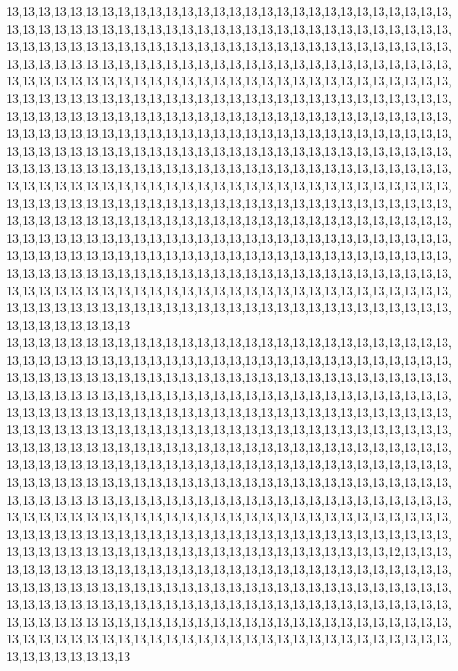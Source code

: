 13,13,13,13,13,13,13,13,13,13,13,13,13,13,13,13,13,13,13,13,13,13,13,13,13,13,13,13,13,13,13,13,13,13,13,13,13,13,13,13,13,13,13,13,13,13,13,13,13,13,13,13,13,13,13,13,13,13,13,13,13,13,13,13,13,13,13,13,13,13,13,13,13,13,13,13,13,13,13,13,13,13,13,13,13,13,13,13,13,13,13,13,13,13,13,13,13,13,13,13,13,13,13,13,13,13,13,13,13,13,13,13,13,13,13,13,13,13,13,13,13,13,13,13,13,13,13,13,13,13,13,13,13,13,13,13,13,13,13,13,13,13,13,13,13,13,13,13,13,13,13,13,13,13,13,13,13,13,13,13,13,13,13,13,13,13,13,13,13,13,13,13,13,13,13,13,13,13,13,13,13,13,13,13,13,13,13,13,13,13,13,13,13,13,13,13,13,13,13,13,13,13,13,13,13,13,13,13,13,13,13,13,13,13,13,13,13,13,13,13,13,13,13,13,13,13,13,13,13,13,13,13,13,13,13,13,13,13,13,13,13,13,13,13,13,13,13,13,13,13,13,13,13,13,13,13,13,13,13,13,13,13,13,13,13,13,13,13,13,13,13,13,13,13,13,13,13,13,13,13,13,13,13,13,13,13,13,13,13,13,13,13,13,13,13,13,13,13,13,13,13,13,13,13,13,13,13,13,13,13,13,13,13,13,13,13,13,13,13,13,13,13,13,13,13,13,13,13,13,13,13,13,13,13,13,13,13,13,13,13,13,13,13,13,13,13,13,13,13,13,13,13,13,13,13,13,13,13,13,13,13,13,13,13,13,13,13,13,13,13,13,13,13,13,13,13,13,13,13,13,13,13,13,13,13,13,13,13,13,13,13,13,13,13,13,13,13,13,13,13,13,13,13,13,13,13,13,13,13,13,13,13,13,13,13,13,13,13,13,13,13,13,13,13,13,13,13,13,13,13,13,13,13,13,13,13,13,13,13,13,13,13,13,13,13,13,13,13,13,13,13,13,13,13,13,13,13,13,13,13,13,13,13,13,13,13,13,13,13,13,13,13,13,13,13,13,13,13,13,13,13,13,13,13,13,13,13,13,13,13,13,13,13,13,13,13,13,13,13,13,13,13,13,13,13,13,13,13,13,13,13,13
13,13,13,13,13,13,13,13,13,13,13,13,13,13,13,13,13,13,13,13,13,13,13,13,13,13,13,13,13,13,13,13,13,13,13,13,13,13,13,13,13,13,13,13,13,13,13,13,13,13,13,13,13,13,13,13,13,13,13,13,13,13,13,13,13,13,13,13,13,13,13,13,13,13,13,13,13,13,13,13,13,13,13,13,13,13,13,13,13,13,13,13,13,13,13,13,13,13,13,13,13,13,13,13,13,13,13,13,13,13,13,13,13,13,13,13,13,13,13,13,13,13,13,13,13,13,13,13,13,13,13,13,13,13,13,13,13,13,13,13,13,13,13,13,13,13,13,13,13,13,13,13,13,13,13,13,13,13,13,13,13,13,13,13,13,13,13,13,13,13,13,13,13,13,13,13,13,13,13,13,13,13,13,13,13,13,13,13,13,13,13,13,13,13,13,13,13,13,13,13,13,13,13,13,13,13,13,13,13,13,13,13,13,13,13,13,13,13,13,13,13,13,13,13,13,13,13,13,13,13,13,13,13,13,13,13,13,13,13,13,13,13,13,13,13,13,13,13,13,13,13,13,13,13,13,13,13,13,13,13,13,13,13,13,13,13,13,13,13,13,13,13,13,13,13,13,13,13,13,13,13,13,13,13,13,13,13,13,13,13,13,13,13,13,13,13,13,13,13,13,13,13,13,13,13,13,13,13,13,13,13,13,13,13,13,13,13,13,13,13,13,13,13,13,13,13,13,13,13,13,13,13,13,13,13,13,13,13,13,13,13,13,13,13,13,13,13,13,13,13,13,13,13,13,13,13,13,13,13,13,12,13,13,13,13,13,13,13,13,13,13,13,13,13,13,13,13,13,13,13,13,13,13,13,13,13,13,13,13,13,13,13,13,13,13,13,13,13,13,13,13,13,13,13,13,13,13,13,13,13,13,13,13,13,13,13,13,13,13,13,13,13,13,13,13,13,13,13,13,13,13,13,13,13,13,13,13,13,13,13,13,13,13,13,13,13,13,13,13,13,13,13,13,13,13,13,13,13,13,13,13,13,13,13,13,13,13,13,13,13,13,13,13,13,13,13,13,13,13,13,13,13,13,13,13,13,13,13,13,13,13,13,13,13,13,13,13,13,13,13,13,13,13,13,13,13,13,13,13,13,13,13

